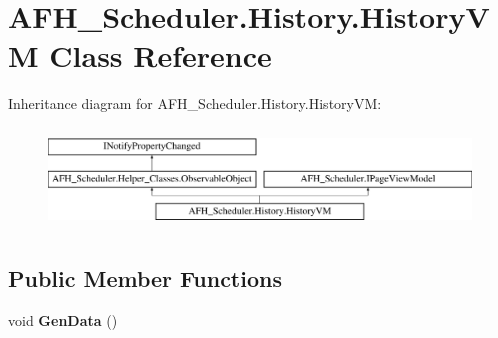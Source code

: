 \section{A\+F\+H\+\_\+\+Scheduler.\+History.\+History\+VM Class Reference}
\label{class_a_f_h___scheduler_1_1_history_1_1_history_v_m}
Inheritance diagram for A\+F\+H\+\_\+\+Scheduler.\+History.\+History\+VM\+:\begin{figure}[H]
\begin{center}
\leavevmode
\includegraphics[height=2.700965cm]{class_a_f_h___scheduler_1_1_history_1_1_history_v_m}
\end{center}
\end{figure}
\subsection*{Public Member Functions}
\begin{DoxyCompactItemize}
\item 
void \textbf{ Gen\+Data} ()
\end{DoxyCompactItemize}
